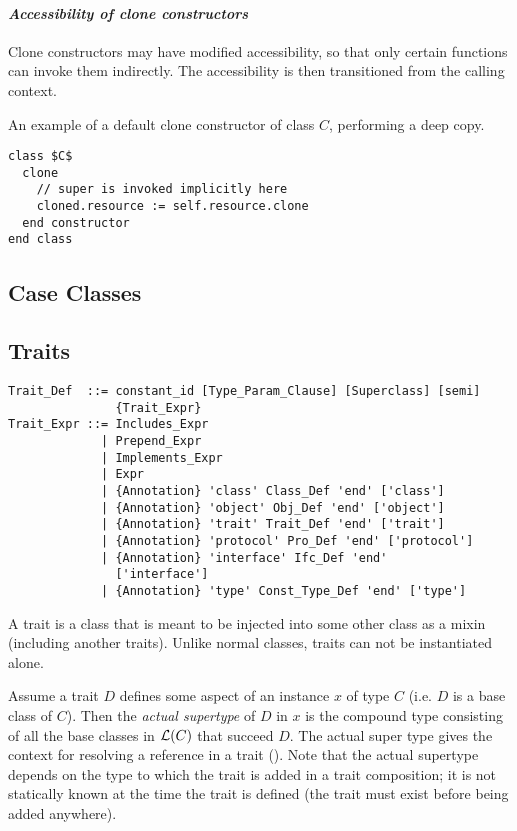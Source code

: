 \paragraph{\em Accessibility of clone constructors}
Clone constructors may have modified accessibility, so that only certain functions can invoke them indirectly. The accessibility is then transitioned from the calling context. 

\example An example of a default clone constructor of class $C$, performing a deep copy. 
\begin{lstlisting}
class $C$
  clone
    // super is invoked implicitly here
    cloned.resource := self.resource.clone
  end constructor
end class
\end{lstlisting}

\subsection{Case Classes}
\label{sec:case-classes}

\subsection{Traits}
\label{sec:traits}

\syntax\begin{lstlisting}
Trait_Def  ::= constant_id [Type_Param_Clause] [Superclass] [semi] 
               {Trait_Expr}
Trait_Expr ::= Includes_Expr
             | Prepend_Expr
             | Implements_Expr
             | Expr
             | {Annotation} 'class' Class_Def 'end' ['class']
             | {Annotation} 'object' Obj_Def 'end' ['object']
             | {Annotation} 'trait' Trait_Def 'end' ['trait']
             | {Annotation} 'protocol' Pro_Def 'end' ['protocol']
             | {Annotation} 'interface' Ifc_Def 'end' 
               ['interface']
             | {Annotation} 'type' Const_Type_Def 'end' ['type']
\end{lstlisting}

A trait is a class that is meant to be injected into some other class as a mixin (including another traits). Unlike normal classes, traits can not be instantiated alone. 

Assume a trait $D$ defines some aspect of an instance $x$ of type $C$ (i.e. $D$ is a base class of $C$). Then the {\em actual supertype} of $D$ in $x$ is the compound type consisting of all the base classes in ${\cal L}(C)$ that succeed $D$. The actual super type gives the context for resolving a  reference in a trait (). Note that the actual supertype depends on the type to which the trait is added in a trait composition; it is not statically known at the time the trait is defined (the trait must exist before being added anywhere). 

